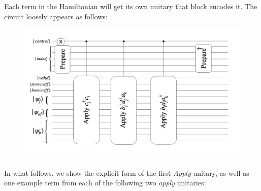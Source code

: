 Each term in the Hamiltonian will get its own unitary that block encodes it. The circuit loosely appears as follows:

\begin{figure}[h]
    \includegraphics[width = \linewidth]{figures/H_example_LOBE_circuit.png}
\end{figure}

In what follows, we show the explicit form of the first \textit{Apply} unitary, as well as one example term from each of the following two \textit{apply} unitaries:

